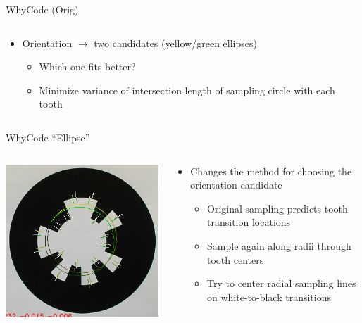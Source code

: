\documentclass[aspectratio=169]{beamer}
\begin{document}
\begin{frame}{WhyCode (Orig)}
\begin{columns}
\begin{column}{0.6\textwidth}
\begin{itemize}
		\item Orientation $\rightarrow$ two candidates (yellow/green ellipses)
		\begin{itemize}
			\item Which one fits better?
			\item Minimize variance of intersection length of sampling circle with each tooth
		\end{itemize}
	\end{itemize}
	\end{column}
	\end{columns}
\end{frame}

\begin{frame}{WhyCode ``Ellipse''}
	\begin{columns}
	\begin{column}{0.4\textwidth}
		\centering
		\includegraphics[width=\linewidth]{./images/whycode_ellipse_both_solutions_cropped.png}
	\end{column}
	\begin{column}{0.6\textwidth}
	\begin{itemize}
		\item Changes the method for choosing the orientation candidate
		\begin{itemize}
			\item Original sampling predicts tooth transition locations
			\item Sample again along radii through tooth centers
			\item Try to center radial sampling lines on white-to-black transitions
		\end{itemize}
	\end{itemize}
	\end{column}
	\end{columns}
\end{frame}
\end{document}
